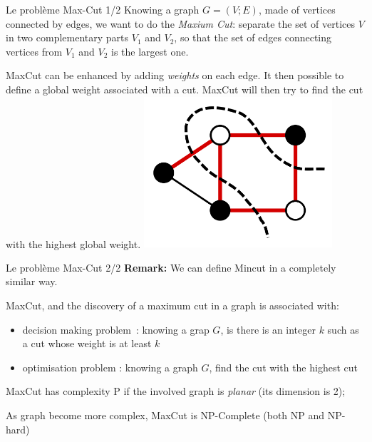 \begin{frame}{Le problème Max-Cut 1/2}
Knowing a graph $G=(V ; E)$, made of vertices connected by edges, we want to do the \textit{Maxium Cut}: separate the 
set of vertices $V$ in two complementary parts $V_1$ and $V_2$, so that the set of edges connecting vertices from
$V_1$ and $V_2$ is the largest one. 
\newline

MaxCut can be enhanced by adding \textit{weights} on each edge. It then possible to define a global weight associated with 
a cut. MaxCut will then try to find the cut with the highest global weight.
\centering
\includegraphics[width=7cm]{images/Max-cut.svg.png}
\end{frame}

\begin{frame}{Le problème Max-Cut 2/2}
\textbf{Remark:} We can define Mincut in a completely similar way.

MaxCut, and the discovery of a maximum cut in a graph is associated with:
\begin{itemize}
    \item decision making problem~: knowing a grap $G$, is there is an integer $k$ such as a cut whose weight is at least $k$
    \item optimisation problem : knowing a graph $G$, find the cut with the highest cut
\end{itemize}

MaxCut has complexity P if the involved graph is \textit{planar} (its dimension is 2); \newline


As graph become more complex, MaxCut is NP-Complete (both NP and NP-hard)
\end{frame}

